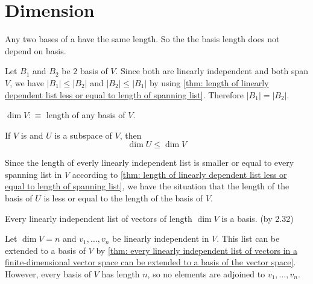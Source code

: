 \section{Dimension}

\setcounter{thm}{33}
\begin{thm}  Any two bases of a \fdvs have the same length. So the the basis length does not depend on basis.
\end{thm}
\begin{prf}
  Let $B_1$ and $B_2$ be $2$ basis of $V$. Since both are linearly independent and both span $V$, we have $|B_1| \leq |B_2|$ and $|B_2| \leq |B_1|$ by using \ref{thm: length of linearly dependent list less or equal to length of spanning list}. Therefore $|B_1|=|B_2|.$
\end{prf}

\begin{mydef} [dimension]
  $\dim V :\equiv$ length of any basis of $V$.
\end{mydef}

\setcounter{thm}{36}
\begin{thm} 
  \label{thm: dimension of a subspace}
  If $V$ is \fd and $U$ is a subspace of $V$, then
  \begin{equation}
    \dim U \leq \dim V
  \end{equation}
\end{thm}
\begin{prf}
  Since the length of everly linearly independent list is smaller or equal to every spanning list in $V$ according to
  \ref{thm: length of linearly dependent list less or equal to length of spanning list}, we have the situation that the length of the basis of $U$ is less or equal to the length of the basis of $V$.
\end{prf}


\begin{thm} 
  \label{thm: linearly independent list of the right length is a basis}
  Every linearly independent list of vectors of length $\dim V$ is a basis. (by 2.32)
\end{thm}
\begin{prf}
  Let $\dim V = n$ and $v_1, \ldots, v_n$ be linearly independent in $V$. This list can be extended to a basis of $V$ by \ref{thm: every linearly independent list of vectors in a finite-dimensional vector space can be extended to a basis of the vector space}. However, every basis of $V$ has length $n$, so no elements are adjoined to $v_1, \ldots, v_n$.
\end{prf}

